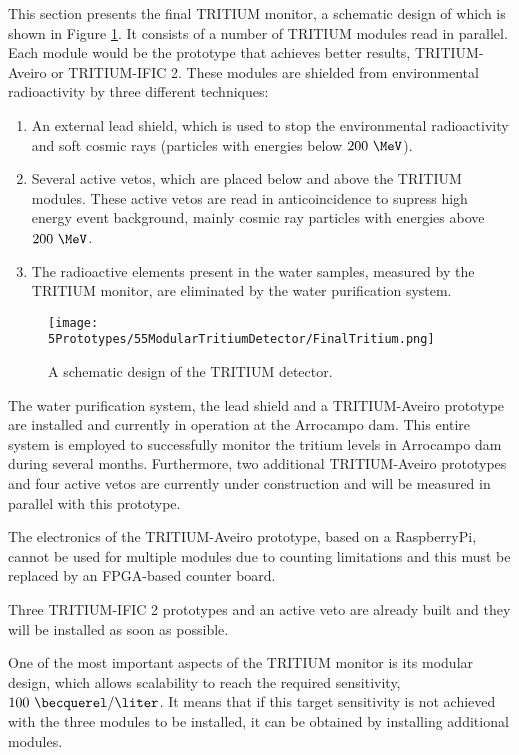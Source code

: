 This section presents the final TRITIUM monitor, a schematic design of which is shown in Figure \ref{fig:TritiumDetectorSchematicDesign}. It consists of a number of TRITIUM modules read in parallel. Each module would be the prototype that achieves better results, TRITIUM-Aveiro or TRITIUM-IFIC 2. These modules are shielded from environmental radioactivity by three different techniques:

\begin{enumerate}

\item{} An external lead shield, which is used to stop the environmental radioactivity and soft cosmic rays (particles with energies below $200~\MeV$).

\item{} Several active vetos, which are placed below and above the TRITIUM modules. These active vetos are read in anticoincidence to supress high energy event background, mainly cosmic ray particles with energies above $200~\MeV$.

\item{} The radioactive elements present in the water samples, measured by the TRITIUM monitor, are eliminated by the water purification system.

\end{enumerate}

\begin{figure}[h]
\centering
\texttt{[image: 5Prototypes/55ModularTritiumDetector/FinalTritium.png]}
\caption{A schematic design of the TRITIUM detector.\label{fig:TritiumDetectorSchematicDesign}}
\end{figure}

The water purification system, the lead shield and a TRITIUM-Aveiro prototype are installed and currently in operation at the Arrocampo dam. This entire system is employed to successfully monitor the tritium levels in Arrocampo dam during several months. Furthermore, two additional TRITIUM-Aveiro prototypes and four active vetos are currently under construction and will be measured in parallel with this prototype.

The electronics of the TRITIUM-Aveiro prototype, based on a RaspberryPi, cannot be used for multiple modules due to counting limitations and this must be replaced by an FPGA-based counter board.

Three TRITIUM-IFIC 2 prototypes and an active veto are already built and they will be installed as soon as possible.

One of the most important aspects of the TRITIUM monitor is its modular design, which allows scalability to reach the required sensitivity, $100~\becquerel/\liter$. It means that if this target sensitivity is not achieved with the three modules to be installed, it can be obtained by installing additional modules.

